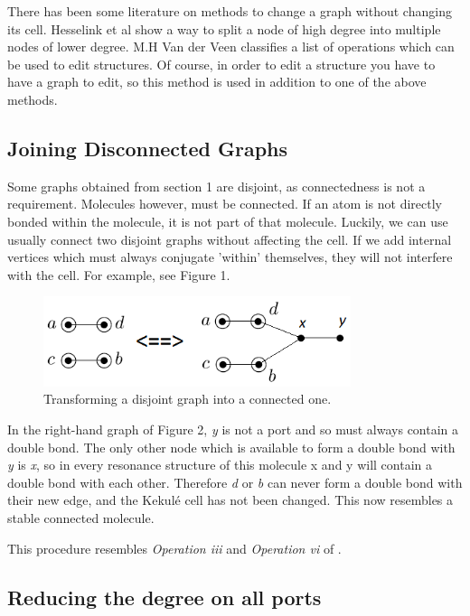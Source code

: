 \documentclass[12pt]{article}
\begin{document}
There has been some literature on methods to change a graph without changing its cell. Hesselink et al \cite{HH13} show a way to split a node of high degree into multiple nodes of lower degree. M.H Van der Veen \cite{v06} classifies a list of operations which can be used to edit structures. Of course, in order to edit a structure you have to have a graph to edit, so this method is used in addition to one of the above methods. 

\subsection{Joining Disconnected Graphs}

Some graphs obtained from section 1 are disjoint, as connectedness is not a requirement. Molecules however, must be connected. If an atom is not directly bonded within the molecule, it is not part of that molecule. Luckily, we can use usually connect two disjoint graphs without affecting the cell. If we add internal vertices which must always conjugate 'within' themselves, they will not interfere with the cell. For example, see Figure 1. 

\begin{figure}[ht!]
\centering
\includegraphics[width=90mm]{equivalence.png}
\caption{Transforming a disjoint graph into a connected one.}
\end{figure}

In the right-hand graph of Figure 2, \textit{y} is not a port and so must always contain a double bond. The only other node which is available to form a double bond with \textit{y} is \textit{x}, so in every resonance structure of this molecule x and y will contain a double bond with each other. Therefore \textit{d} or \textit{b} can never form a double bond with their new edge, and the Kekul\'{e} cell has not been changed. This now resembles a stable connected molecule. 

This procedure resembles \textit{Operation iii} and \textit{Operation vi} of \cite{v06}. 

\subsection{Reducing the degree on all ports}
\end{document}
